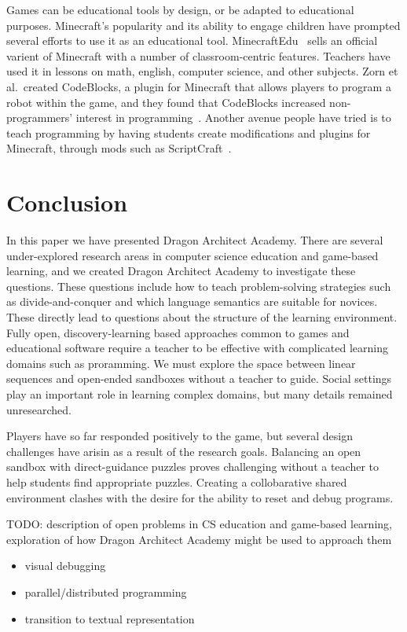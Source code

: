 \documentclass{sig-alternate}
\newcommand{\TODO}[1]{{\color{red} TODO: #1}}
\newcommand{\gametitle}{{\color{RoyalPurple} Dragon Architect Academy}}
\begin{document}
Games can be educational tools by design, or be adapted to educational purposes. 
Minecraft's popularity and its ability to engage children have prompted several efforts to use it as an educational tool.
MinecraftEdu~\cite{minecraftedu} sells an official varient of Minecraft with a number of classroom-centric features. 
Teachers have used it in lessons on math, english, computer science, and other subjects.  
Zorn et al.\ created CodeBlocks, a plugin for Minecraft that allows players to program a robot within the game, and they found that CodeBlocks increased non-programmers' interest in programming~\cite{zorn2013minecraft}.
Another avenue people have tried is to teach programming by having students create modifications and plugins for Minecraft, through mods such as ScriptCraft~\cite{scriptcraft}.

\section{Conclusion}

In this paper we have presented \gametitle{}.
There are several under-explored research areas in computer science education and game-based learning, and we created \gametitle{} to investigate these questions.
These questions include how to teach problem-solving strategies such as divide-and-conquer and which language semantics are suitable for novices.
These directly lead to questions about the structure of the learning environment.
Fully open, discovery-learning based approaches common to games and educational software require a teacher to be effective with complicated learning domains such as proramming.
We must explore the space between linear sequences and open-ended sandboxes without a teacher to guide.
Social settings play an important role in learning complex domains, but many details remained unresearched.

Players have so far responded positively to the game, but several design challenges have arisin as a result of the research goals.
Balancing an open sandbox with direct-guidance puzzles proves challenging without a teacher to help students find appropriate puzzles.
Creating a collobarative shared environment clashes with the desire for the ability to reset and debug programs.

\TODO{description of open problems in CS education and game-based learning, exploration of how \gametitle{} might be used to approach them}
\begin{itemize}
\item visual debugging
\item parallel/distributed programming
\item transition to textual representation
\end{itemize}



 
\end{document}
